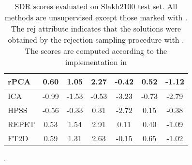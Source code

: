 \documentclass[a4paper]{article}
\begin{document}
\begin{table}[t!]
{\begin{tabular}{lcccccl}
\multicolumn{1}{|l|}{rPCA\cite{rpca}}            & 0.60                      & \multicolumn{1}{c|}{1.05}          & 2.27                      & \multicolumn{1}{c|}{-0.42}          & 0.52                    & \multicolumn{1}{c|}{-1.12}          \\ \hline
\multicolumn{1}{|l|}{ICA\cite{ica}}           & -0.99                     & \multicolumn{1}{c|}{-1.53}         & \multicolumn{1}{c}{-0.53} & \multicolumn{1}{c|}{-3.23}         & -0.73                   & \multicolumn{1}{c|}{-2.79}        \\ \hline
\multicolumn{1}{|l|}{HPSS \cite{hpss}}            & -0.56                     & \multicolumn{1}{c|}{-0.33}          & 0.31                     & \multicolumn{1}{c|}{-2.72}          & 0.15                     & \multicolumn{1}{c|}{-0.38}          \\ \hline
\multicolumn{1}{|l|}{REPET\cite{repet}}          & 0.53                      & \multicolumn{1}{c|}{1.54}           & 2.91                      & \multicolumn{1}{c|}{0.11} & 0.40                    & \multicolumn{1}{c|}{-1.09}           \\ \hline
\multicolumn{1}{|l|}{FT2D \cite{ft2d}}            & 0.59                      & \multicolumn{1}{c|}{1.31}          & 2.63                      & \multicolumn{1}{c|}{-0.15}          & 0.65                    & \multicolumn{1}{c|}{-1.02}         \\ \hline
\end{tabular}
}
\vspace{0.1cm}
\caption{SDR scores evaluated on Slakh2100 test set. All methods are unsupervised except those marked with . The \textnormal{rej} attribute indicates that the solutions were obtained by the rejection sampling procedure with . The scores are computed according to the implementation in \cite{SiSEC18}}.
\label{table:sdr}
\end{table}
\end{document}
